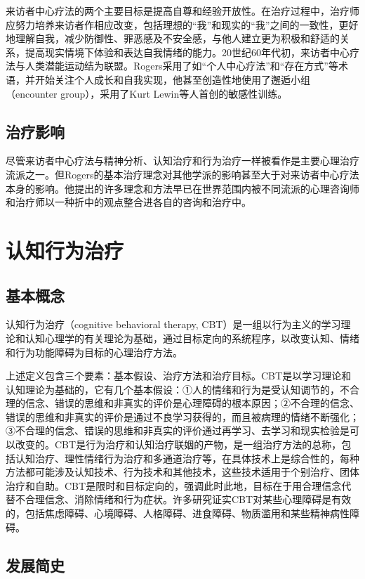来访者中心疗法的两个主要目标是提高自尊和经验开放性。在治疗过程中，治疗师应努力培养来访者作相应改变，包括理想的“我”和现实的“我”之间的一致性，更好地理解自我，减少防御性、罪恶感及不安全感，与他人建立更为积极和舒适的关系，提高现实情境下体验和表达自我情绪的能力。20世纪60年代初，来访者中心疗法与人类潜能运动结为联盟。Rogers采用了如“个人中心疗法”和“存在方式”等术语，并开始关注个人成长和自我实现，他甚至创造性地使用了邂逅小组（encounter
group），采用了Kurt Lewin等人首创的敏感性训练。

\subsection{治疗影响}

尽管来访者中心疗法与精神分析、认知治疗和行为治疗一样被看作是主要心理治疗流派之一。但Rogers的基本治疗理念对其他学派的影响甚至大于对来访者中心疗法本身的影响。他提出的许多理念和方法早已在世界范围内被不同流派的心理咨询师和治疗师以一种折中的观点整合进各自的咨询和治疗中。


\section{认知行为治疗}

\subsection{基本概念}

认知行为治疗（cognitive behavioral therapy,
CBT）是一组以行为主义的学习理论和认知心理学的有关理论为基础，通过目标定向的系统程序，以改变认知、情绪和行为功能障碍为目标的心理治疗方法。

上述定义包含三个要素：基本假设、治疗方法和治疗目标。CBT是以学习理论和认知理论为基础的，它有几个基本假设：①人的情绪和行为是受认知调节的，不合理的信念、错误的思维和非真实的评价是心理障碍的根本原因；②不合理的信念、错误的思维和非真实的评价是通过不良学习获得的，而且被病理的情绪不断强化；③不合理的信念、错误的思维和非真实的评价通过再学习、去学习和现实检验是可以改变的。CBT是行为治疗和认知治疗联姻的产物，是一组治疗方法的总称，包括认知治疗、理性情绪行为治疗和多通道治疗等，在具体技术上是综合性的，每种方法都可能涉及认知技术、行为技术和其他技术，这些技术适用于个别治疗、团体治疗和自助。CBT是限时和目标定向的，强调此时此地，目标在于用合理信念代替不合理信念、消除情绪和行为症状。许多研究证实CBT对某些心理障碍是有效的，包括焦虑障碍、心境障碍、人格障碍、进食障碍、物质滥用和某些精神病性障碍。

\subsection{发展简史}

